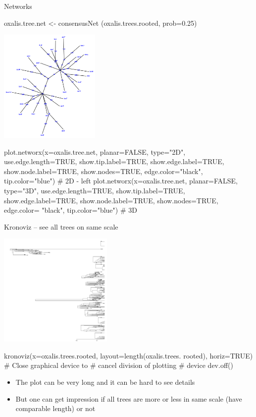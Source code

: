 \documentclass[compress, ucs, xelatex, 11pt, xcolor=svgnames,
  hyperref={
    bookmarks=true,
    unicode=true,
    colorlinks=true,
    pdftitle={Molecular data in R},
    plainpages=false,
    pdfauthor={Vojtech Zeisek},
    pdfsubject={Course about phylogeny and evolution in R},
    pdfcreator={XeLaTeX},
    pdfkeywords={R, evolution, phylogeny, molecular data},
    linkcolor=Tomato,
    anchorcolor=SaddleBrown,
    citecolor=Goldenrod,
    filecolor=DarkMagenta,
    menucolor=Sienna,
    urlcolor=DarkTurquoise,
    pdftex},
  url={hyphens, lowtilde} %
  ]{beamer}
\begin{document}
\begin{frame}[fragile]{Networks}
\begin{multicols}{2}
  \vfil
  \begin{spluscode}
    oxalis.tree.net <- consensusNet
      (oxalis.trees.rooted, prob=0.25)
  \end{spluscode}
  \vfil
  \includegraphics[height=5.5cm]{oxalis-net.png}
  \vfil
  \begin{spluscode}
    plot.networx(x=oxalis.tree.net,
      planar=FALSE, type="2D",
      use.edge.length=TRUE,
      show.tip.label=TRUE,
      show.edge.label=TRUE,
      show.node.label=TRUE,
      show.nodes=TRUE,
      edge.color="black",
      tip.color="blue") # 2D - left
    plot.networx(x=oxalis.tree.net,
      planar=FALSE, type="3D",
      use.edge.length=TRUE,
      show.tip.label=TRUE,
      show.edge.label=TRUE,
      show.node.label=TRUE,
      show.nodes=TRUE, edge.color=
      "black", tip.color="blue") # 3D
  \end{spluscode}
\end{multicols}
\end{frame}

\begin{frame}[fragile]{Kronoviz -- see all trees on same scale}
\begin{multicols}{2}
  \includegraphics[height=5.5cm]{kronoviz.png}
  \begin{spluscode}
    kronoviz(x=oxalis.trees.rooted,
      layout=length(oxalis.trees.
      rooted), horiz=TRUE)
    # Close graphical device to
    # cancel division of plotting
    # device
    dev.off()
  \end{spluscode}
  \vfill
  \begin{itemize}
    \item The plot can be very long and it can be hard to see details
    \item But one can get impression if all trees are more or less in same scale (have comparable length) or not
  \end{itemize}
  \vfil
\end{multicols}
\end{frame}
\end{document}
